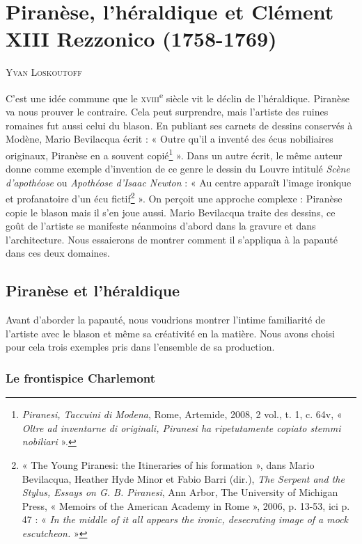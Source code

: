 \documentclass[12pt,twoside,openany]{book}
\newcommand{\PurhContributors}[1]{%
  \par\vspace{0.5\baselineskip}%
  {\normalsize\scshape #1\par}%
  \vspace{0.6\baselineskip}%
}
\begin{document}
\chapter{Piranèse, l’héraldique et Clément XIII Rezzonico (1758-1769)}

\PurhContributors{Yvan Loskoutoff}

C’est une idée commune que le \textsc{xviii}\textsuperscript{e} siècle vit le déclin de l’héraldique. Piranèse va nous prouver le contraire. Cela peut surprendre, mais l’artiste des ruines romaines fut aussi celui du blason. En publiant ses carnets de dessins conservés à Modène, Mario Bevilacqua écrit : « Outre qu’il a inventé des écus nobiliaires originaux, Piranèse en a souvent copié\footnote{\textit{Piranesi, Taccuini di Modena}, Rome, Artemide, 2008, 2 vol., t. 1, c. 64v, « \textit{Oltre ad inventarne di originali, Piranesi ha ripetutamente copiato stemmi nobiliari }».} ». Dans un autre écrit, le même auteur donne comme exemple d’invention de ce genre le dessin du Louvre intitulé \textit{Scène d’apothéose} ou \textit{Apothéose d’Isaac Newton} : « Au centre apparaît l’image ironique et profanatoire d’un écu fictif\footnote{« The Young Piranesi: the Itineraries of his formation », dans Mario Bevilacqua, Heather Hyde Minor et Fabio Barri (dir.), \textit{The Serpent and the Stylus, Essays on G. B. Piranesi}, Ann Arbor, The University of Michigan Press, « Memoirs of the American Academy in Rome », 2006, p. 13-53, ici p. 47 : « \textit{In the middle of it all appears the ironic, desecrating image of a mock escutcheon.} »} ». On perçoit une approche complexe : Piranèse copie le blason mais il s’en joue aussi. Mario Bevilacqua traite des dessins, ce goût de l’artiste se manifeste néanmoins d’abord dans la gravure et dans l’architecture. Nous essaierons de montrer comment il s’appliqua à la papauté dans ces deux domaines.

\section{Piranèse et l’héraldique}

Avant d’aborder la papauté, nous voudrions montrer l’intime familiarité de l’artiste avec le blason et même sa créativité en la matière. Nous avons choisi pour cela trois exemples pris dans l’ensemble de sa production.

\subsection{Le frontispice Charlemont}
\end{document}
